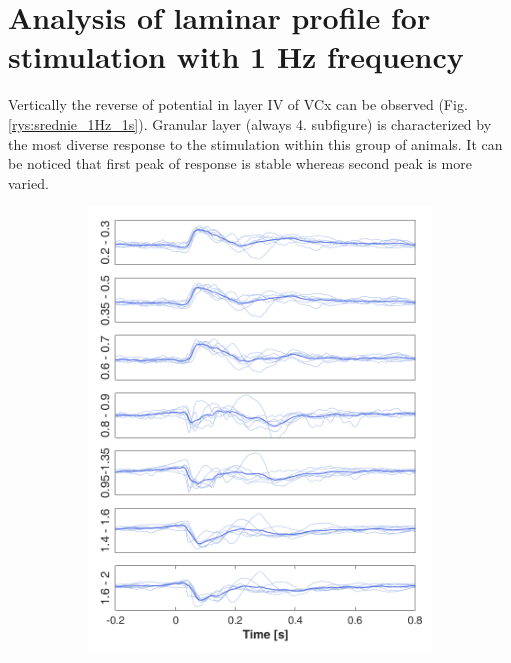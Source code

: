 \documentclass{pracalicmgr}
\begin{document}
    
    \section{Analysis of laminar profile for stimulation with 1 Hz frequency}
    Vertically the reverse of potential in layer IV of VCx can be observed (Fig. \ref{rys:srednie_1Hz_1s}). Granular layer (always 4. subfigure) is characterized by the most diverse response to the stimulation within this group of animals. It can be noticed that first peak of response is stable whereas second peak is more varied. 
	\begin{figure}[H]
	\begin{subfigure}{.5\textwidth}
		\centering
		\includegraphics[width=1.\linewidth]{srednie_1Hz_linie.png}
		\caption{}
		\label{rys:srednie_1Hz_linie}
	\end{subfigure}%
	\begin{subfigure}{.5\textwidth}
		\centering

\end{subfigure}
\end{figure}
\end{document}
